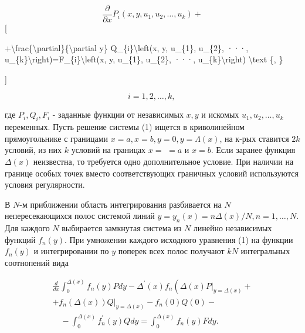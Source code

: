 \documentclass[10pt]{article}
\begin{document}
\[

\frac{\partial}{\partial x} P_{i}\left(x, y, u_{1}, u_{2}, \ldots, u_{k}\right)+

\][



+\textbackslash frac\{\textbackslash partial\}\{\textbackslash partial y\} Q\_\{i\}\textbackslash left(x, y, u\_\{1\}, u\_\{2\}, ···, u\_\{k\}\textbackslash right)=F\_\{i\}\textbackslash left(x, y, u\_\{1\}, u\_\{2\}, ···, u\_\{k\}\textbackslash right) \textbackslash text \{, \}

]



\[

i=1,2, \ldots, k \text {, }

\]



где $P_{i}, Q_{i}, F_{i}$ - заданные функции от независимых $x, y$ и искомых $u_{1}, u_{2}, \ldots, u_{k}$ переменных. Пусть решение системы (1) ищется в криволинейном прямоугольнике с границами $x=a, x=b, y=0, y=\Lambda(x)$, на к-рых ставится $2 k$ условий, из них $k$ условий на границах $x=$ $=a$ и $x=b$. Если заранее функция $\Delta(x)$ неизвестна, то требуется одно дополнительное условие. При наличии на границе особых точек вместо соответствующих граничных условий используются условия регулярности.



В $N$-м приближении область интегрирования разбивается на $N$ непересекающихся полос системой линий $y=y_{n}(x)=n \Delta(x) / N, n=1, \ldots, N$. Для каждого $N$ выбирается замкнутая система из $N$ линейно независимых функций $f_{n}(y)$. При умножении каждого исходного уравнения (1) на функции $f_{n}(y)$ и интегрировании по $y$ поперек всех полос получают $k N$ интегральных соотнопений вида



\[

\begin{gathered}

\frac{d}{d x} \int_{0}^{\Delta(x)} f_{n}(y) P d y-\Delta^{\prime}(x) f_{n}\left(\left.\Delta(x) P\right|_{y=\Delta(x)}+\right. \\

+\left.f_{n}(\Delta(x)) Q\right|_{y=\Delta(x)}-f_{n}(0) Q(0)- \\

\quad-\int_{0}^{\Delta(x)} f_{n}^{\prime}(y) Q d y=\int_{0}^{\Delta(x)} f_{n}(y) F d y .

\end{gathered}

\]
\end{document}
